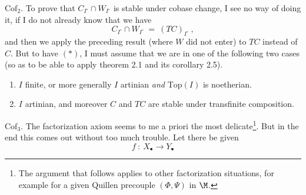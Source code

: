 $\mathrm{Cof}_2$. To prove that $C_{I^\circ} \cap W_{I^\circ}$ is stable under cobase change, I see no way of doing it, if I do not already know that we have
\[ C_{I^\circ} \cap W_{I^\circ} \ = \ (TC)_{I^\circ}\ , \tag*{$(*)$} \]
and then we apply the preceding result (where $W$ did not enter) to $TC$ instead of $C$. But to have $(*)$, I must assume that we are in one of the following two cases (so as to be able to apply theorem 2.1 and its corollary 2.5).
\begin{enumerate}[leftmargin=2.5em]
\item[a)] $I$ finite, or more generally $I$ artinian \textit{and} $\mathrm{Top}(I)$ is noetherian.
\item[b)] $I$ artinian, and moreover $C$ and $TC$ are stable under transfinite composition.
\end{enumerate}
$\mathrm{Cof}_3$. The factorization axiom seems to me a priori the most delicate\footnote[15]{The argument that follows applies to other factorization situations, for example for a given Quillen precouple $(\Phi, \Psi)$ in $\M$.}. But in the end this comes out without too much trouble. Let there be given %
\[ f \ : \ X_\bullet \longrightarrow Y_\bullet \]